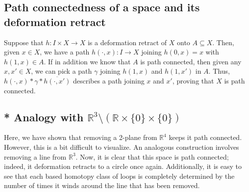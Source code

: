 \documentclass[11pt]{article}
\def\R{\mathbb{R}}
\theoremstyle{definition}
\theoremstyle{remark}
\begin{document}
    \subsection*{Path connectedness of a space and its deformation retract}

    Suppose that $h\colon I \times X \to X$ is a deformation retract of $X$ onto
    $A\subseteq X$. Then, given $x \in X$, we have a path $h(\cdot, x)\colon I \to X$
    joining $h(0, x) = x$ with $h(1, x) \in A$. If in addition we know that $A$ is
    path connected, then given any $x, x' \in X$, we can pick a path $\gamma$ joining
    $h(1, x)$ and $h(1, x')$ in $A$. Thus, $h(\cdot, x) * \gamma * \overline{h(\cdot,
    x')}$ describes a path joining $x$ and $x'$, proving that $X$ is path connected.


    \subsection*{* Analogy with $\R^3\setminus(\R\times \{0\}\times\{0\})$}

    Here, we have shown that removing a 2-plane from $\R^4$ keeps it path connected.
    However, this is a bit difficult to visualize. An analogous construction involves
    removing a line from $\R^3$. Now, it is clear that this space is path connected;
    indeed, it deformation retracts to a circle once again. Additionally, it is easy
    to see that each based homotopy class of loops is completely determined by the
    number of times it winds around the line that has been removed.
\end{document}
